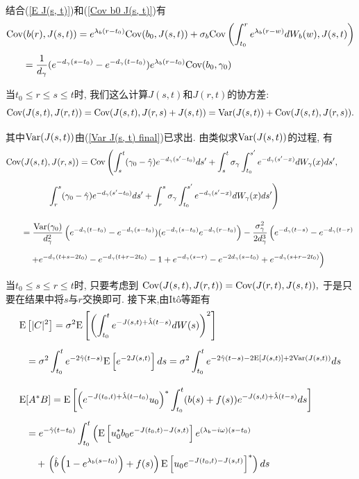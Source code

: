 \documentclass[notitlepage,cs4size,punct,oneside]{ctexrep}
\numberwithin{equation}{section}
\theoremstyle{mystyle}
\newcommand{\nq}{\\[5pt]}
\newcommand{\nw}{\\[10pt]}
\begin{document}
结合(\ref{E J(s, t)})和(\ref{Cov b0 J(s, t)})有
\[
\begin{split}
\Cov&(b(r), J(s, t)) = e^{\lambda_b(r-t_0)}\Cov(b_0, J(s, t)) + \sigma_b\Cov\left(\int_{t_0}^r e^{\lambda_b(r-w)}dW_b(w), J(s, t)\right) \nq
&= \frac{1}{d_\gamma}(e^{-d_\gamma(s-t_0)}-e^{-d_\gamma(t-t_0)})e^{\lambda_b(r-t_0)}\Cov(b_0, \gamma_0)
\end{split}
\]

当$t_0 \leqslant r \leqslant s \leqslant t$时, 我们这么计算$J(s, t)$和$J(r, t)$的协方差:
\[
\text{Cov}(J(s, t), J(r, t)) = \text{Cov}(J(s, t), J(r, s)+J(s, t)) = \text{Var}(J(s, t)) + \text{Cov}(J(s, t), J(r, s)).
\]

其中$\text{Var}(J(s, t))$由(\ref{Var J(s, t) final})已求出. 由类似求$\text{Var}(J(s, t))$的过程, 有
\[
\begin{split}
\Cov&(J(s, t), J(r, s)) = \Cov\left(\int_s^t(\gamma_0-\hat{\gamma})e^{-d_\gamma(s'-t_0)}ds' +\int_s^t \sigma_\gamma\int_{t_0}^{s'} e^{-d_\gamma(s'-x)}dW_\gamma(x)ds',\right. \nq
&\quad\quad\quad\left. \int_r^s(\gamma_0-\hat{\gamma})e^{-d_\gamma(s'-t_0)}ds' +\int_r^s \sigma_\gamma\int_{t_0}^{s'} e^{-d_\gamma(s'-x)}dW_\gamma(x)ds'\right) \nw
&= \frac{\Var(\gamma_0)}{d_\gamma^2}\left(e^{-d_\gamma(t-t_0)}-e^{-d_\gamma(s-t_0)})(e^{-d_\gamma(s-t_0)}e^{-d_\gamma(r-t_0)}\right)-\frac{\sigma_\gamma^2}{2d_\gamma^3}\left(e^{-d_\gamma(t-s)}-e^{-d_\gamma(t-r)}  \right.\nq
&\left.\quad+e^{-d_\gamma(t+s-2t_0)}-e^{-d_\gamma(t+r-2t_0)}-1+e^{-d_\gamma(s-r)}-e^{-2d_\gamma(s-t_0)}+e^{-d_\gamma(s+r-2t_0)}\right)
\end{split}
\]

当$t_0 \leqslant s \leqslant r \leqslant t$时, 只要考虑到
$
\text{Cov}(J(s, t), J(r, t)) = \text{Cov}(J(r, t), J(s, t)),
$
于是只要在结果中将$s$与$r$交换即可. 接下来,由It\^o等距有
\[
\begin{split}
\E&\left[|C|^2\right] = \sigma^2\E\left[\left(\int_{t_0}^t e^{-J(s, t)+\hat{\lambda}(t-s)}dW(s)\right)^2\right] \nq
&= \sigma^2\int_{t_0}^te^{-2\hat\gamma(t-s)}\E\left[e^{-2J(s, t)}\right]ds = \sigma^2\int_{t_0}^t e^{-2\hat\gamma(t-s)-2\E[J(s, t)]+2\Var(J(s, t))}ds \nw
\E&[A^*B] = \E\left[\left(e^{-J(t_0, t)+\hat{\lambda}(t-t_0)}u_0\right)^*\int_{t_0}^t(b(s)+f(s))e^{-J(s, t)+\hat{\lambda}(t-s)}ds\right]\nq
&= e^{-\hat\gamma(t-t_0)}\int_{t_0}^t \left(\E\left[u_0^*b_0e^{-J(t_0, t)-J(s, t)}\right]e^{(\lambda_b-i\omega)(s-t_0)}\right.\nq
&\quad+\left.\left(\hat{b}\left(1-e^{\lambda_b(s-t_0)}\right)+f(s)\right)\E\left[u_0e^{-J(t_0, t)-J(s, t)}\right]^*\right)ds
\end{split}
\]
\end{document}
